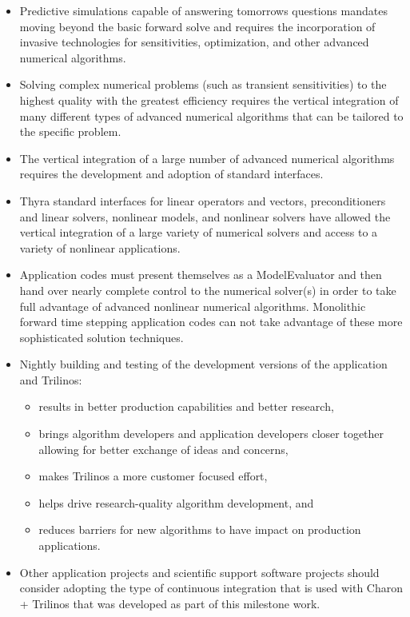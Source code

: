 \documentclass[pdf,ps2pdf,11pt]{SANDreport}
\begin{document}
\begin{itemize}

{}\item Predictive simulations capable of answering tomorrows questions
mandates moving beyond the basic forward solve and requires the incorporation
of invasive technologies for sensitivities, optimization, and other advanced
numerical algorithms.

{}\item Solving complex numerical problems (such as transient sensitivities)
to the highest quality with the greatest efficiency requires the vertical
integration of many different types of advanced numerical algorithms that can
be tailored to the specific problem.

{}\item The vertical integration of a large number of advanced numerical
algorithms requires the development and adoption of standard interfaces.

{}\item Thyra standard interfaces for linear operators and vectors,
preconditioners and linear solvers, nonlinear models, and nonlinear solvers
have allowed the vertical integration of a large variety of numerical solvers
and access to a variety of nonlinear applications.

{}\item Application codes must present themselves as a ModelEvaluator and then
hand over nearly complete control to the numerical solver(s) in order to take
full advantage of advanced nonlinear numerical algorithms.  Monolithic forward
time stepping application codes can not take advantage of these more
sophisticated solution techniques.

{}\item Nightly building and testing of the development versions of the
application and Trilinos:

  \begin{itemize}

  {}\item results in better production capabilities and better research,

  {}\item brings algorithm developers and application developers closer
  together allowing for better exchange of ideas and concerns,

  {}\item makes Trilinos a more customer focused effort,

  {}\item helps drive research-quality algorithm development, and
        
  {}\item reduces barriers for new algorithms to have impact on production
  applications.

  \end{itemize}

{}\item Other application projects and scientific support software projects
should consider adopting the type of continuous integration that is used with
Charon + Trilinos that was developed as part of this milestone work.

\end{itemize}
\end{document}
